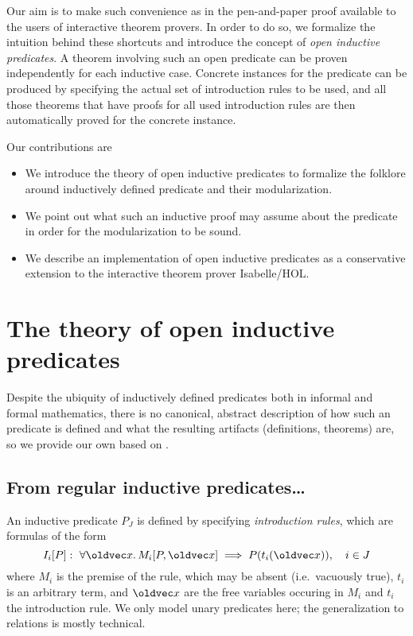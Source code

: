 \documentclass{llncs}
\makeatletter
\let\vec\oldvec%
\newcommand{\nolisttopbreak}{\par\nobreak\@afterheading}
\makeatother
\begin{document}
Our aim is to make such convenience as in the pen-and-paper proof available to the users of interactive theorem provers. In order to do so, we formalize the intuition behind these shortcuts and introduce the concept of \emph{open inductive predicates}. A theorem involving such an open predicate can be proven independently for each inductive case. Concrete instances for the predicate can be produced by specifying the actual set of introduction rules to be used, and all those theorems that have proofs for all used introduction rules are then automatically proved for the concrete instance.

\noindent Our contributions are\nolisttopbreak
\begin{itemize}
\item We introduce the theory of open inductive predicates to formalize the folklore around inductively defined predicate and their modularization.
\item We point out what such an inductive proof may assume about the predicate in order for the modularization to be sound.
\item We describe an implementation of open inductive predicates as a conservative extension to the interactive theorem prover Isabelle/HOL.
\end{itemize}

\section{The theory of open inductive predicates}

Despite the ubiquity of inductively defined predicates both in informal and formal mathematics, there is no canonical, abstract description of how such an predicate is defined and what the resulting artifacts (definitions, theorems) are, so we provide our own based on \cite{paulson-2000}.

\subsection{From regular inductive predicates\ldots}

An inductive predicate $P_J$ is defined by specifying \emph{introduction rules}, which are formulas of the form
\[
I_i[P]:\ \forall \vec x.\,   M_i[P, \vec x] \implies P(t_i(\vec x)), \quad i \in J
\]
where $M_i$ is the premise of the rule, which may be absent (i.e.\ vacuously true), $t_i$ is an arbitrary term, and $\vec x$ are the free variables occuring in $M_i$ and $t_i$ the introduction rule. We only model unary predicates here; the generalization to relations is mostly technical.
\end{document}
